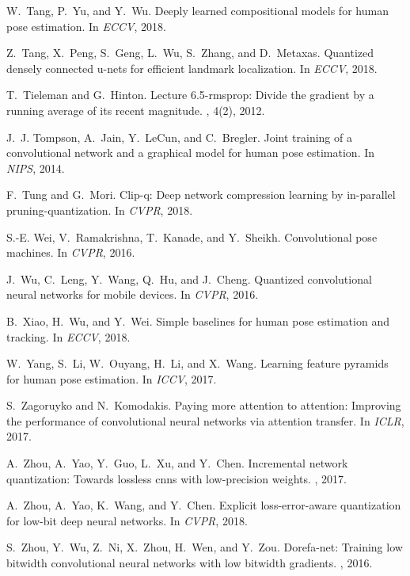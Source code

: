 \documentclass[10pt,twocolumn,letterpaper]{article}
\begin{document}
{\begin{thebibliography}{10}
W.~Tang, P.~Yu, and Y.~Wu.
\newblock Deeply learned compositional models for human pose estimation.
\newblock In {\em ECCV}, 2018.

Z.~Tang, X.~Peng, S.~Geng, L.~Wu, S.~Zhang, and D.~Metaxas.
\newblock Quantized densely connected u-nets for efficient landmark
  localization.
\newblock In {\em ECCV}, 2018.

T.~Tieleman and G.~Hinton.
\newblock Lecture 6.5-rmsprop: Divide the gradient by a running average of its
  recent magnitude.
, 4(2), 2012.

J.~J. Tompson, A.~Jain, Y.~LeCun, and C.~Bregler.
\newblock Joint training of a convolutional network and a graphical model for
  human pose estimation.
\newblock In {\em NIPS}, 2014.

F.~Tung and G.~Mori.
\newblock Clip-q: Deep network compression learning by in-parallel
  pruning-quantization.
\newblock In {\em CVPR}, 2018.

S.-E. Wei, V.~Ramakrishna, T.~Kanade, and Y.~Sheikh.
\newblock Convolutional pose machines.
\newblock In {\em CVPR}, 2016.

J.~Wu, C.~Leng, Y.~Wang, Q.~Hu, and J.~Cheng.
\newblock Quantized convolutional neural networks for mobile devices.
\newblock In {\em CVPR}, 2016.

B.~Xiao, H.~Wu, and Y.~Wei.
\newblock Simple baselines for human pose estimation and tracking.
\newblock In {\em ECCV}, 2018.

W.~Yang, S.~Li, W.~Ouyang, H.~Li, and X.~Wang.
\newblock Learning feature pyramids for human pose estimation.
\newblock In {\em ICCV}, 2017.

S.~Zagoruyko and N.~Komodakis.
\newblock Paying more attention to attention: Improving the performance of
  convolutional neural networks via attention transfer.
\newblock In {\em ICLR}, 2017.

A.~Zhou, A.~Yao, Y.~Guo, L.~Xu, and Y.~Chen.
\newblock Incremental network quantization: Towards lossless cnns with
  low-precision weights.
, 2017.

A.~Zhou, A.~Yao, K.~Wang, and Y.~Chen.
\newblock Explicit loss-error-aware quantization for low-bit deep neural
  networks.
\newblock In {\em CVPR}, 2018.

S.~Zhou, Y.~Wu, Z.~Ni, X.~Zhou, H.~Wen, and Y.~Zou.
\newblock Dorefa-net: Training low bitwidth convolutional neural networks with
  low bitwidth gradients.
, 2016.

\end{thebibliography}
 
}
\end{document}
